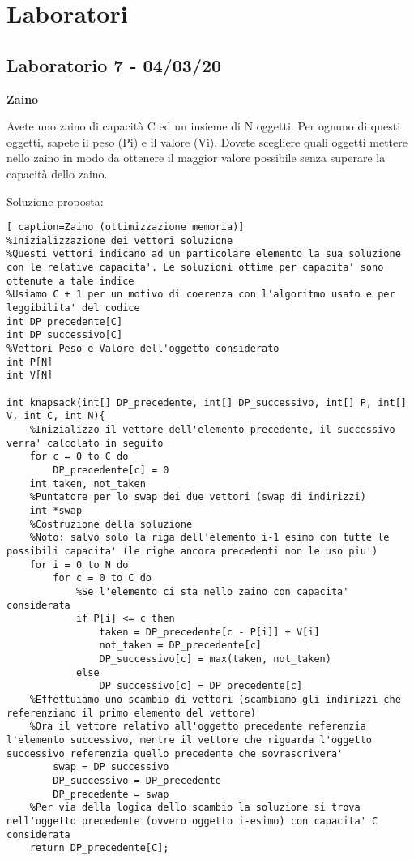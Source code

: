\documentclass[../cheatSheetAlgoritmi.tex]{subfiles}
\begin{document}
\chapter{Laboratori}
\section{Laboratorio 7 - 04/03/20}
\textbf{Zaino}

Avete uno zaino di capacità C ed un insieme di N oggetti. Per ognuno di questi oggetti, sapete il peso (Pi) e il valore (Vi). Dovete scegliere quali oggetti mettere nello zaino in modo da ottenere il maggior valore possibile senza superare la capacità dello zaino.

\bigskip

Soluzione proposta:
\begin{lstlisting}[ caption=Zaino (ottimizzazione memoria)]
%Inizializzazione dei vettori soluzione
%Questi vettori indicano ad un particolare elemento la sua soluzione con le relative capacita'. Le soluzioni ottime per capacita' sono ottenute a tale indice
%Usiamo C + 1 per un motivo di coerenza con l'algoritmo usato e per leggibilita' del codice
int DP_precedente[C]
int DP_successivo[C]
%Vettori Peso e Valore dell'oggetto considerato
int P[N]
int V[N]

int knapsack(int[] DP_precedente, int[] DP_successivo, int[] P, int[] V, int C, int N){
	%Inizializzo il vettore dell'elemento precedente, il successivo verra' calcolato in seguito
	for c = 0 to C do
		DP_precedente[c] = 0
	int taken, not_taken
	%Puntatore per lo swap dei due vettori (swap di indirizzi)
	int *swap
	%Costruzione della soluzione
	%Noto: salvo solo la riga dell'elemento i-1 esimo con tutte le possibili capacita' (le righe ancora precedenti non le uso piu')
	for i = 0 to N do
		for c = 0 to C do
			%Se l'elemento ci sta nello zaino con capacita' considerata
			if P[i] <= c then
				taken = DP_precedente[c - P[i]] + V[i]
				not_taken = DP_precedente[c]
				DP_successivo[c] = max(taken, not_taken)
			else
				DP_successivo[c] = DP_precedente[c]		
	%Effettuiamo uno scambio di vettori (scambiamo gli indirizzi che referenziano il primo elemento del vettore)
	%Ora il vettore relativo all'oggetto precedente referenzia l'elemento successivo, mentre il vettore che riguarda l'oggetto successivo referenzia quello precedente che sovrascrivera'
		swap = DP_successivo
		DP_successivo = DP_precedente
		DP_precedente = swap	
	%Per via della logica dello scambio la soluzione si trova nell'oggetto precedente (ovvero oggetto i-esimo) con capacita' C considerata
	return DP_precedente[C];
	
\end{lstlisting}
\end{document}
